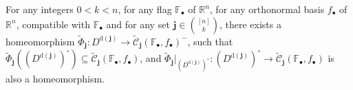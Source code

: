 \begin{lemma}\label{lem:shub_dim} For any integers $0<k<n$, for any flag $\mathbb{F}_{\bullet}$ of $\mathbb{R}^n$, for any orthonormal basis $f_{\bullet}$ of $\mathbb{R}^n$, compatible with $\mathbb{F}_{\bullet}$ and for any set $\mathbf{j}\in\binom{[n]}{k}$, there exists a homeomorphism
$\tilde{\Phi}_{\mathbf{j}}:D^{\mathrm{d}(\mathbf{j})}\to\tilde{\mathcal{C}}_{\mathbf{j}}{\left(\mathbb{F}_{\bullet},f_{\bullet}\right)}^-$,
such that $\tilde{\Phi}_{\mathbf{j}}\left({\left(D^{\mathrm{d}(\mathbf{j})}\right)}^{\circ}\right)\subseteq\tilde{\mathcal{C}}_{\mathbf{j}}(\mathbb{F}_{\bullet},f_{\bullet})$, and
$\tilde{\Phi}_{\mathbf{j}}|_{{\left(D^{\mathrm{d}(\mathbf{j})}\right)}^{\circ}}:{\left(D^{\mathrm{d}(\mathbf{j})}\right)}^{\circ}\to\tilde{\mathcal{C}}_{\mathbf{j}}(\mathbb{F}_{\bullet},f_{\bullet})$
is also a homeomorphism.
\end{lemma}
